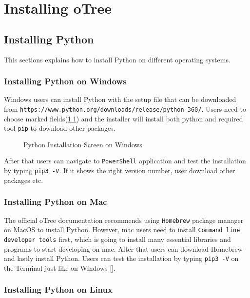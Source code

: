 \begin{appendix} \label{anhang}
\chapter{Installing oTree} \label{anhang1}

\section{Installing Python}

This sections explains how to install Python on different operating systems. 

\subsection{Installing Python on Windows}

Windows users can install Python with the setup file that can be downloaded from \verb|https://www.python.org/downloads/release/python-360/|. Users 
need to choose marked fields(\ref{fig:picture1}) and the installer will install both python and required tool \verb|pip| to download other packages.

\begin{figure}[h]
	\centerline{}
	\caption{Python Installation Screen on Windows}
	\label{fig:picture1}
\end{figure}


After that users can navigate to  \verb|PowerShell| application and test the installation by typing  \verb|pip3 -V|. If it shows the right version number, user download other packages etc.


\subsection{Installing Python on Mac}

The official oTree documentation recommends using \verb|Homebrew| package manager on MacOS to install Python. However, mac users need to install \verb|Command line developer tools| first, which is going to install many essential libraries and programs to start developing on mac. After that users can download Homebrew and lastly install Python. Users can test the installation by typing \verb|pip3 -V| on the Terminal just like on Windows [\cite{oTreeInstall2017}].

\subsection{Installing Python on Linux}


\end{appendix}
